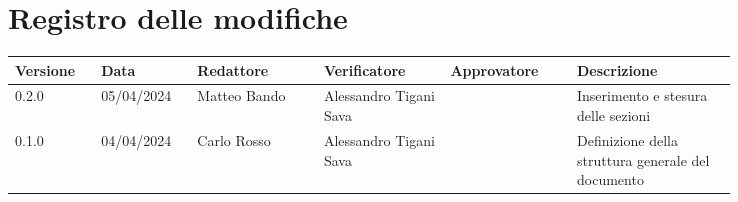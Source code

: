 \section*{Registro delle modifiche}
 {
  \scriptsize
  \begin{tabular}{p{0.10\linewidth}p{0.10\linewidth}p{0.15\linewidth}p{0.15\linewidth}p{0.15\linewidth}p{0.19\linewidth}}
	  \textbf{Versione} & \textbf{Data} & \textbf{Redattore}     & \textbf{Verificatore} & \textbf{Approvatore} & \textbf{Descrizione}                                                                                             \\
	  \hline
	  0.2.0             & 05/04/2024    & Matteo Bando & Alessandro Tigani Sava               &               & Inserimento e stesura delle sezioni \\ 
	  \hline
	  0.1.0             & 04/04/2024    & Carlo Rosso & Alessandro Tigani Sava               &               & Definizione della struttura generale del documento \\
	  \hline

  \end{tabular}
 }
